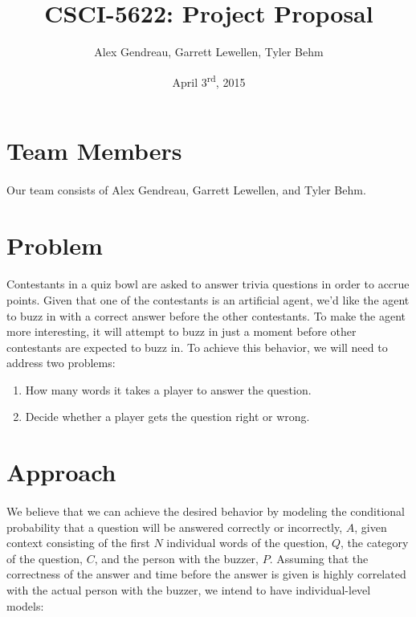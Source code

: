 \documentclass[letterpaper]{article}
\begin{document}
\title{CSCI-5622: Project Proposal}
\author{Alex Gendreau, Garrett Lewellen, Tyler Behm}
\date{April 3\textsuperscript{rd}, 2015}

\maketitle

\section*{Team Members}

\paragraph{} Our team consists of Alex Gendreau, Garrett Lewellen, and Tyler Behm.

\section*{Problem}

\paragraph{} Contestants in a quiz bowl are asked to answer trivia questions in order to accrue points. Given that one of the contestants is an artificial agent, we'd like the agent to buzz in with a correct answer before the other contestants. To make the agent more interesting, it will attempt to buzz in just a moment before other contestants are expected to buzz in. To achieve this behavior, we will need to address two problems:

\begin{enumerate}
	\item How many words it takes a player to answer the question.
	\item Decide whether a player gets the question right or wrong.
\end{enumerate}

\section*{Approach}

\paragraph{} We believe that we can achieve the desired behavior by modeling the conditional probability that a question will be answered correctly or incorrectly, $A$, given context consisting of the first $N$ individual words of the question, $Q$, the category of the question, $C$, and the person with the buzzer, $P$. Assuming that the correctness of the answer and time before the answer is given is highly correlated with the actual person with the buzzer, we intend to have individual-level models:
\end{document}

